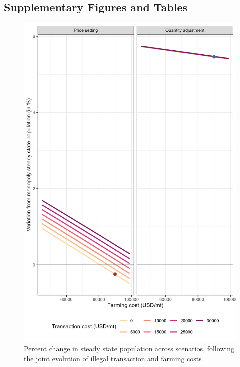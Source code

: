 \clearpage
\subsection{Supplementary Figures and Tables}
\setcounter{table}{5}

\begin{figure}[H]
    \centering
    \includegraphics[width = .7\textwidth]{figures/totoaba/sup_figure3.png}
    \caption{Percent change in steady state population across scenarios, following the joint evolution of illegal transaction and farming costs}
    \label{fig:c_and_v}
\end{figure}
\newpage


